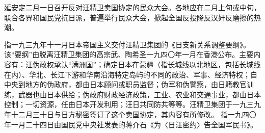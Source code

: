 延安定二月一日召开反对汪精卫卖国协定的民众大会。各地应在二月上旬或中旬，联合各界和国民党抗日派，普遍举行民众大会，掀起全国反投降反汉奸反磨擦的热潮。


\begin{maonote}
指一九三九年十一月日本帝国主义交付汪精卫集团的《日支新关系调整要纲》。该“要纲”由脱离汪精卫集团的高宗武、陶希圣一九四〇年一月在香港公布。主要内容有：汪伪政权承认“满洲国”；确定日本在蒙疆（指长城线以北地区，包括长城线在内）、华北、长江下游和华南沿海特定岛屿的不同的政治、军事、经济特权；自中央到地方的伪政府，都由日本顾问或职员监督；伪军和伪警察，由日籍教官训练，武器也由日本供给；伪政府财政经济政策，工业、农业和交通事业，都由日本控制；一切资源，任由日本开发利用；汪日共同防共等等。汪精卫集团于一九三九年十二月三十日与日方秘密签订了这个卖国协定，其内容有所修改。
指一九四〇年一月二十四日由国民党中央社发表的蒋介石《为〈日汪密约〉告全国军民书》。
\end{maonote}
